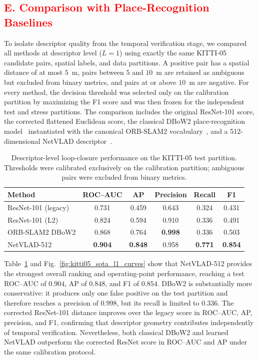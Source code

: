 \documentclass{ieeeaccess}
\begin{document}
{\color{red}
\subsection*{\textcolor{red}{E. Comparison with Place-Recognition Baselines}}
\label{subsec:kitti05_sota_l1}

To isolate descriptor quality from the temporal verification stage, we compared all methods at descriptor level ($L=1$) using exactly the same KITTI-05 candidate pairs, spatial labels, and data partitions. A positive pair has a spatial distance of at most $5$~m, pairs between $5$ and $10$~m are retained as ambiguous but excluded from binary metrics, and pairs at or above $10$~m are negative. For every method, the decision threshold was selected only on the calibration partition by maximizing the F1 score and was then frozen for the independent test and stress partitions. The comparison includes the original ResNet-101 score, the corrected flattened Euclidean score, the classical DBoW2 place-recognition model~\cite{GalvezLopez2012DBoW2} instantiated with the canonical ORB-SLAM2 vocabulary~\cite{MurArtal2017ORBSLAM2}, and a 512-dimensional NetVLAD descriptor~\cite{Arandjelovic2016NetVLAD}.

\begin{table}[H]
\centering
\color{red}
\caption{\color{red}Descriptor-level loop-closure performance on the KITTI-05 test partition. Thresholds were calibrated exclusively on the calibration partition; ambiguous pairs were excluded from binary metrics.}
\label{tab:kitti05_sota_l1}
\footnotesize
\setlength{\tabcolsep}{2.6pt}
\begin{tabular}{lccccc}
\toprule
Method & ROC--AUC & AP & Precision & Recall & F1 \\
\midrule
ResNet-101 (legacy) & 0.731 & 0.459 & 0.643 & 0.324 & 0.431 \\
ResNet-101 (L2) & 0.824 & 0.594 & 0.910 & 0.336 & 0.491 \\
ORB-SLAM2 DBoW2 & 0.868 & 0.764 & \textbf{0.998} & 0.336 & 0.503 \\
NetVLAD-512 & \textbf{0.904} & \textbf{0.848} & 0.958 & \textbf{0.771} & \textbf{0.854} \\
\bottomrule
\end{tabular}
\end{table}

Table~\ref{tab:kitti05_sota_l1} and Fig.~\ref{fig:kitti05_sota_l1_curves} show that NetVLAD-512 provides the strongest overall ranking and operating-point performance, reaching a test ROC--AUC of $0.904$, AP of $0.848$, and F1 of $0.854$. DBoW2 is substantially more conservative: it produces only one false positive on the test partition and therefore reaches a precision of $0.998$, but its recall is limited to $0.336$. The corrected ResNet-101 distance improves over the legacy score in ROC--AUC, AP, precision, and F1, confirming that descriptor geometry contributes independently of temporal verification. Nevertheless, both classical DBoW2 and learned NetVLAD outperform the corrected ResNet score in ROC--AUC and AP under the same calibration protocol.

}
\end{document}
